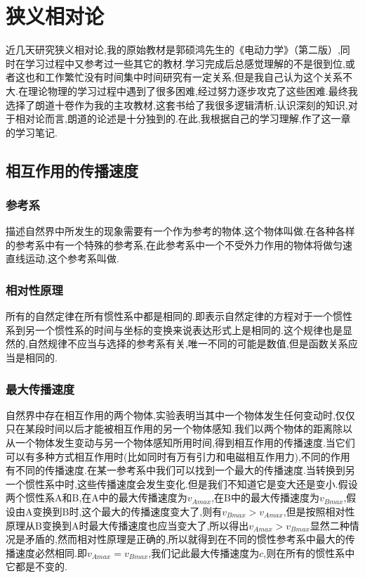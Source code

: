 \chapter{狭义相对论}
近几天研究狭义相对论,我的原始教材是郭硕鸿先生的《电动力学》（第二版）,同时在学习过程中又参考过一些其它的教材.学习完成后总感觉理解的不是很到位,或者这也和工作繁忙没有时间集中时间研究有一定关系,但是我自己认为这个关系不大.在理论物理的学习过程中遇到了很多困难,经过努力逐步攻克了这些困难.最终我选择了朗道十卷作为我的主攻教材,这套书给了我很多逻辑清析,认识深刻的知识,对于相对论而言,朗道的论述是十分独到的.在此,我根据自己的学习理解,作了这一章的学习笔记.

\section{相互作用的传播速度}

\subsection{参考系}

描述自然界中所发生的现象需要有一个作为参考的物体,这个物体叫做.在各种各样的参考系中有一个特殊的参考系,在此参考系中一个不受外力作用的物体将做匀速直线运动,这个参考系叫做.

\subsection{相对性原理}

所有的自然定律在所有惯性系中都是相同的.即表示自然定律的方程对于一个惯性系到另一个惯性系的时间与坐标的变换来说表达形式上是相同的.这个规律也是显然的,自然规律不应当与选择的参考系有关,唯一不同的可能是数值,但是函数关系应当是相同的.

\subsection{最大传播速度}

自然界中存在相互作用的两个物体,实验表明当其中一个物体发生任何变动时,仅仅只在某段时间以后才能被相互作用的另一个物体感知.我们以两个物体的距离除以从一个物体发生变动与另一个物体感知所用时间,得到相互作用的传播速度.当它们可以有多种方式相互作用时(比如同时有万有引力和电磁相互作用力),不同的作用有不同的传播速度.在某一参考系中我们可以找到一个最大的传播速度.当转换到另一个惯性系中时,这些传播速度会发生变化.但是我们不知道它是变大还是变小.假设两个惯性系A和B,在A中的最大传播速度为$v_{Amax}$,在B中的最大传播速度为$v_{Bmax}$,假设由A变换到B时,这个最大的传播速度变大了,则有$v_{Bmax}>v_{Amax}$,但是按照相对性原理从B变换到A时最大传播速度也应当变大了,所以得出$v_{Amax}>v_{Bmax}$显然二种情况是矛盾的,然而相对性原理是正确的,所以就得到在不同的惯性参考系中最大的传播速度必然相同.即$v_{Amax}=v_{Bmax}$,我们记此最大传播速度为$c$,则在所有的惯性系中它都是不变的.

